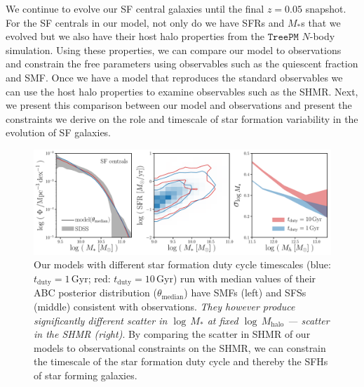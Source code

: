 \documentclass[12pt, letterpaper, preprint]{aastex}
\begin{document}
We continue to evolve our SF central galaxies until the final $z = 0.05$ 
snapshot. For the SF centrals in our model, not only do we have SFRs and 
$M_*$s that we evolved but we also have their host halo properties from the 
$\mathtt{TreePM}$ $N$-body simulation. Using these properties, we can compare 
our model to observations and constrain the free parameters using observables 
such as the quiescent fraction and SMF. Once we have a model that reproduces 
the standard observables we can use the host halo properties to examine 
observables such as the SHMR. Next, we present this comparison between 
our model and observations and present the constraints we derive on the role 
and timescale of star formation variability in the evolution of SF galaxies.

\begin{figure}
\begin{center}
\includegraphics[width=\textwidth]{figs/qaplot_abc.pdf}
    \caption{Our models with different star formation duty cycle timescales 
    (blue: $t_\mathrm{duty}{=}1\,\mathrm{Gyr}$; red: $t_\mathrm{duty}{=}10\,\mathrm{Gyr}$) 
    run with median values of their ABC posterior distribution ($\theta_\mathrm{median}$) 
    have SMFs (left) and SFSs (middle) consistent with observations. \emph{They however produce 
    significantly different scatter in $\log\,M_*$ at fixed $\log\,M_\mathrm{halo}$ --- 
    scatter in the SHMR (right)}. By comparing the scatter in SHMR of our models to observational 
    constraints on the SHMR, we can constrain the timescale of the star formation duty cycle and 
    thereby the SFHs of star forming galaxies.
    }
\label{fig:abc_demo}
\end{center}
\end{figure}
\end{document}
